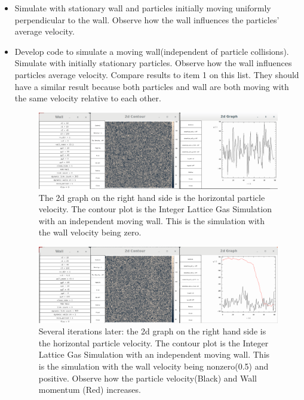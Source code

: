 \documentclass{article}
\begin{document}
\begin{itemize}
  \item Simulate with stationary wall and particles initially moving uniformly perpendicular to the wall. Observe how the wall influences the particles' average velocity.
 
    
  \item Develop code to simulate a moving wall(independent of particle collisions). Simulate with initially stationary particles. Observe how the wall influences particles average velocity. Compare results to item 1 on this list. They should have a similar result because both particles and wall are both moving with the same velocity relative to each other.
\begin{figure}

\includegraphics[scale=0.2]{ms1p0.png}
\caption{\label{fig} The 2d graph on the right hand side is the horizontal particle velocity. The contour plot is the Integer Lattice Gas Simulation with an independent moving wall. This is the simulation with the wall velocity being zero.}
\end{figure} 

\begin{figure}

\includegraphics[scale=0.2]{ms1p1.png}
\caption{\label{fig} Several iterations later: the 2d graph on the right hand side is the horizontal particle velocity. The contour plot is the Integer Lattice Gas Simulation with an independent moving wall. This is the simulation with the wall velocity being nonzero(0.5) and positive. Observe how the particle velocity(Black) and Wall momentum (Red) increases.}
\end{figure}


\end{itemize}
\end{document}

